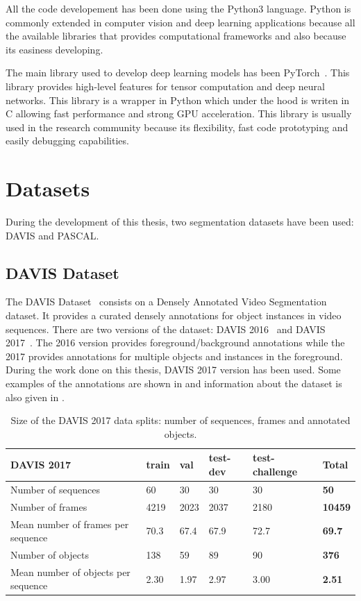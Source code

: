 All the code developement has been done using the Python3 language.
Python is commonly extended in computer vision and deep learning applications because all the available libraries that provides computational frameworks and also because its easiness developing.

The main library used to develop deep learning models has been PyTorch~\cite{paszke2017automatic}. This library provides high-level features for tensor computation and deep neural networks.
This library is a wrapper in Python which under the hood is writen in C allowing fast performance and strong GPU acceleration.
This library is usually used in the research community because its flexibility, fast code prototyping and easily debugging capabilities.

\section{Datasets}

During the development of this thesis, two segmentation datasets have been used: DAVIS and PASCAL.

\subsection{DAVIS Dataset}

The DAVIS Dataset~\cite{Perazzi2016,PontTuset2017} consists on a Densely Annotated Video Segmentation dataset.
It provides a curated densely annotations for object instances in video sequences.
There are two versions of the dataset: DAVIS 2016~\cite{Perazzi2016} and DAVIS 2017~\cite{PontTuset2017}. The 2016 version provides foreground/background annotations while the 2017 provides annotations for multiple objects and instances in the foreground.
During the work done on this thesis, DAVIS 2017 version has been used.
Some examples of the annotations are shown in  and information about the dataset is also given in .

\begin{table}[h]
\centering
\begin{tabular}{l|lllll}
  DAVIS 2017                          & train & val  & test-dev & test-challenge & \textbf{Total} \\
	\hline
  Number of sequences                 & 60    & 30   & 30       & 30             & \textbf{50}    \\
  Number of frames                    & 4219  & 2023 & 2037     & 2180           & \textbf{10459} \\
  Mean number of frames per sequence  & 70.3  & 67.4 & 67.9     & 72.7           & \textbf{69.7}  \\
  Number of objects                   & 138   & 59   & 89       & 90             & \textbf{376}   \\
  Mean number of objects per sequence & 2.30  & 1.97 & 2.97     & 3.00           & \textbf{2.51}
\end{tabular}
\caption{Size of the DAVIS 2017 data splits: number of sequences, frames and annotated objects.}
\label{tab:davis}
\end{table}

